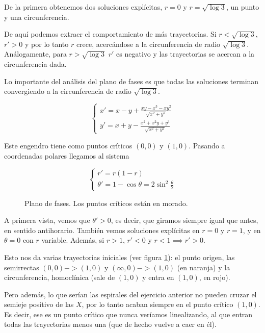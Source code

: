 \begin{example}
De la primera obtenemos dos soluciones explícitas, $r=0$ y $r=\sqrt{\log 3}$, un punto y una circunferencia.

De aquí podemos extraer el comportamiento de más trayectorias. Si $r<\sqrt{\log 3}$, $r'>0$ y por lo tanto $r$ crece, acercándose a la circunferencia de radio $\sqrt{\log 3}$. Análogamente, para $r > \sqrt{\log 3}$ $r'$ es negativo y las trayectorias se acercan a la circunferencia dada.

Lo importante del análisis del plano de fases es que todas las soluciones terminan convergiendo a la circunferencia de radio $\sqrt{\log 3}$.
\end{example}

\begin{example}
\[ \begin{cases}
x' = x-y+\frac{xy-x^3-xy^2}{\sqrt{x^2+y^2}} \\
y' = x+y - \frac{x^2+x^2y+y^3}{\sqrt{x^2+y^2}}
\end{cases} \]

Este engendro tiene como puntos críticos $(0,0)$ y $(1,0)$. Pasando a coordenadas polares llegamos al sistema

\[ \begin{cases}
r' = r(1-r) \\
θ' = 1-\cos θ = 2\sin^2 \frac{θ}{2}
\end{cases} \]

\begin{figure}
\label{img8-Ej5}
\caption{Plano de fases. Los puntos críticos están en morado.}
\end{figure}

A primera vista, vemos que $θ' > 0$, es decir, que giramos siempre igual que antes, en sentido antihorario. También vemos soluciones explícitas en $r=0$ y $r=1$, y en $θ=0$ con $r$ variable. Además, si $r > 1$, $r'<0$ y $r<1 \implies r' > 0$. 

Esto nos da varias trayectorias iniciales (ver figura \ref{img8-Ej5}): el punto origen, las semirrectas $(0,0) -> (1,0)$ y $(∞,0) -> (1,0)$ (en naranja) y la circunferencia, homoclínica (sale de $(1,0)$ y entra en $(1,0)$, en rojo). 

Pero además, lo que serían las espirales del ejercicio anterior no pueden cruzar el semieje positivo de las $X$, por lo tanto acaban siempre en el punto crítico $(1,0)$. Es decir, ese es un punto crítico que nunca veríamos linealizando, al que entran todas las trayectorias menos una (que de hecho vuelve a caer en él).
\end{example}

